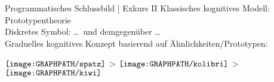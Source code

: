 \begin{frame}
  {Programmatisches Schlussbild | Exkurs II}
  \onslide<+->
  \onslide<+->
  Klassisches kognitives Modell: \alert{Prototypentheorie} \\
  \onslide<+->
  \Zeile
  \alert{Diskretes Symbol}:  \onslide<+-> \ldots\ und demgegenüber \ldots\\
  \onslide<+->
  \alert{Graduelles kognitives Konzept} basierend auf Ähnlichkeiten\slash Prototypen:\\
  \onslide<+->
  \Halbzeile
  \begin{minipage}{0.9\textwidth}
  \centering
    $\vcenter{\hbox{\texttt{[image: \\GRAPHPATH/spatz]}}}$
    \onslide<+->
    \hspace*{0.025\textwidth}>\hspace*{0.025\textwidth}
    $\vcenter{\hbox{\texttt{[image: \\GRAPHPATH/kolibri]}}}$
    \onslide<+->
    \hspace*{0.025\textwidth}>\hspace*{0.025\textwidth}
    $\vcenter{\hbox{\texttt{[image: \\GRAPHPATH/kiwi]}}}$
  \end{minipage}
\end{frame}

